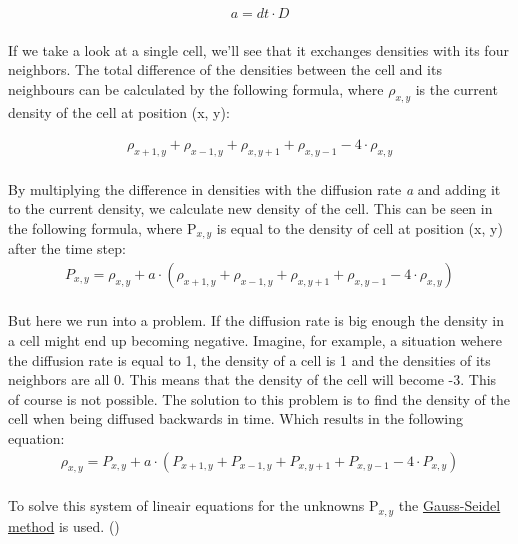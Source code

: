 \documentclass[a4paper,12pt]{article}
\begin{document}
\[
\begin{array}{ll}
  a = dt \cdot D
\end{array}
\] \\

If we take a look at a single cell, we'll see that it exchanges densities with its four neighbors.
The total difference of the densities between the cell and its neighbours can be calculated by the following formula,
where $\rho_{x, y}$ is the current density of the cell at position (x, y):

\[
\begin{array}{ll}
	\rho_{x+1, y} + \rho_{x-1, y} + \rho_{x, y+1} + \rho_{x, y-1} - 4 \cdot \rho_{x, y}
\end{array}
\]  \\

By multiplying the difference in densities with the diffusion rate \textit{a} and adding it to the current density, we calculate new density of the cell. 
This can be seen in the following formula, where P$_{x, y}$ is equal to the density of cell at position (x, y) after the time step: \\

\[
\begin{array}{ll}
	P_{x, y} = \rho_{x, y} + a \cdot (\rho_{x+1, y} + \rho_{x-1, y} + \rho_{x, y+1} + \rho_{x, y-1} - 4 \cdot \rho_{x, y})
\end{array}
\]  \\

But here we run into a problem. If the diffusion rate is big enough the density in a cell might end up becoming negative.
Imagine, for example, a situation wehere the diffusion rate is equal to 1,  the density of a cell is 1 and the densities of its neighbors are all 0. This means that the density of the cell will become -3.
This of course is not possible.
The solution to this problem is to find the density of the cell when being diffused backwards in time. Which results in the following equation: \\

\[
\begin{array}{ll}
	\rho_{x, y} = P_{x, y} + a \cdot (P_{x+1, y} + P_{x-1, y} + P_{x, y+1} + P_{x, y-1} - 4 \cdot P_{x, y})
\end{array}	
\] \\

To solve this system of lineair equations for the unknowns P$_{x, y}$ the \hyperlink{https://en.wikipedia.org/wiki/Gauss–Seidel_method}{Gauss-Seidel method} is used. 
(\cite{josstam}) \\
\end{document}
